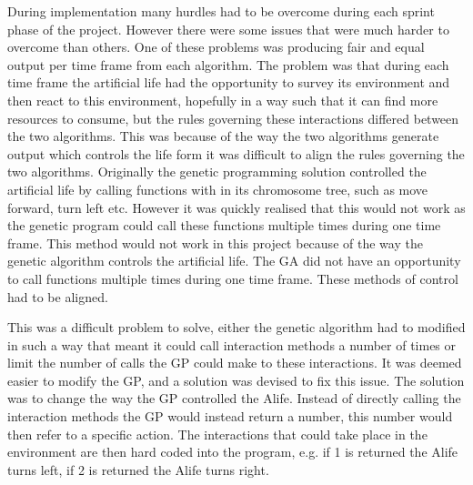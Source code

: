 \documentclass[12pt]{article}
\begin{document}
During implementation many hurdles had to be overcome during each sprint phase of the project. However there were some issues that were much harder to overcome than others. One of these problems was
producing fair and equal output per time frame from each algorithm. The problem was that during each time frame the artificial life had the opportunity to survey its environment and then react to this
environment, hopefully in a way such that it can find more resources to consume, but the rules governing these interactions differed between the two algorithms.
This was because of the way the two algorithms generate output which controls the life form it was difficult to align
the rules governing the two algorithms. Originally the genetic programming solution controlled the artificial life by calling functions with in its chromosome tree, such as move forward, turn left etc.
However it was quickly realised that this would not work as the genetic program could call these functions multiple times during one time frame. This method would not work in this project because
of the way the genetic algorithm controls the artificial life. The GA did not have an opportunity to call functions multiple times during one time frame. These methods of control had to be aligned. 

This was a difficult problem to solve, either the genetic algorithm had to modified in such a way that meant it could call interaction methods
a number of times or limit the number of calls the GP could make to these interactions. It was deemed easier to modify the GP, and a solution
was devised to fix this issue. The solution was to change the way the GP controlled the Alife. Instead of directly calling the interaction methods
the GP would instead return a number, this number would then refer to a specific action. The interactions that could take place in 
the environment are then hard coded into the program, e.g. if 1 is returned the Alife turns left, if 2 is returned the Alife turns right.
\end{document}
